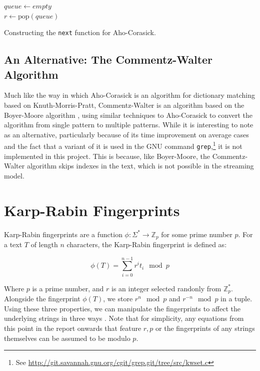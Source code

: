 \documentclass[ %
                    author={Dominic Joseph Moylett},
                    degree={MEng},
                     title={Dictionary Matching with Fingerprints},
                  subtitle={An Empirical Analysis},
                      type={research},
                      year={2015} ]{dissertation}
\begin{document}
\begin{algorithm}[t]
$queue \gets empty$\\
 {
  $r \gets \text{pop}(queue)$\\
}
\caption{Constructing the \texttt{next} function for Aho-Corasick.}
\label{alg:ac-next}
\end{algorithm}

\subsection{An Alternative: The Commentz-Walter Algorithm}

Much like the way in which Aho-Corasick is an algorithm for dictionary matching based on Knuth-Morris-Pratt, Commentz-Walter \cite{commentz-walter:algo} is an algorithm based on the Boyer-Moore algorithm \cite{Boyer:1977:FSS:359842.359859}, using similar techniques to Aho-Corasick to convert the algorithm from single pattern to multiple patterns. While it is interesting to note as an alternative, particularly because of its time improvement on average cases and the fact that a variant of it is used in the GNU command \texttt{grep},\footnote{See \url{http://git.savannah.gnu.org/cgit/grep.git/tree/src/kwset.c}} it is not implemented in this project. This is because, like Boyer-Moore, the Commentz-Walter algorithm skips indexes in the text, which is not possible in the streaming model.

\section{Karp-Rabin Fingerprints}
\label{sec:kr-fingerprints}

Karp-Rabin fingerprints \cite{5390135} are a function $\phi : \Sigma^* \to \mathbb{Z}_p$ for some prime number $p$. For a text $T$ of length $n$ characters, the Karp-Rabin fingerprint is defined as:

$$\phi(T) = \sum_{i = 0}^{n - 1} r^it_i \mod p$$

Where $p$ is a prime number, and $r$ is an integer selected randonly from $\mathbb{Z}^*_p$. Alongside the fingerprint $\phi(T)$, we store $r^n \mod p$ and $r^{-n} \mod p$ in a tuple. Using these three properties, we can manipulate the fingerprints to affect the underlying strings in three ways \cite{5438620}. Note that for simplicity, any equations from this point in the report onwards that feature $r, p$ or the fingerprints of any strings themselves can be assumed to be modulo $p$.
\end{document}
